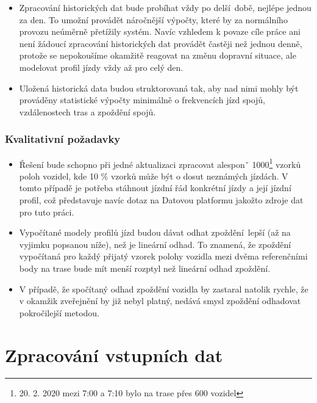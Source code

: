 \begin{itemize}
\item

Zpracování historických dat bude probíhat vždy po delší době, nejlépe jednou za den. To umožní provádět náročnější výpočty, které by za normálního provozu neúměrně přetížily systém. Navíc vzhledem k povaze cíle práce ani není žádoucí zpracování historických dat provádět častěji než jednou denně, protože se nepokoušíme okamžitě reagovat na změnu dopravní situace, ale modelovat profil jízdy vždy až pro celý den.

\item

Uložená historická data budou struktorovaná tak, aby nad nimi mohly být prováděny statistické výpočty minimálně o frekvencích jízd spojů, vzdálenostech tras a zpoždění spojů.
\end{itemize}

\subsubsection{Kvalitativní požadavky}

\begin{itemize}

	\item
	Řešení bude schopno při jedné aktualizaci zpracovat alesponˇ 1000\footnote{20. 2. 2020 mezi 7:00 a 7:10 bylo na trase přes 600 vozidel} vzorků poloh vozidel, kde 10 \% vzorků může být o dosut neznámých jízdách. V tomto případě je potřeba stáhnout jízdní řád konkrétní jízdy a její jízdní profil, což představuje navíc dotaz na Datovou platformu jakožto zdroje dat pro tuto práci.

	\item
	Vypočítané modely profilů jízd budou dávat odhat zpoždění lepší (až na vyjimku popsanou níže), než je lineární odhad. To znamená, že zpoždění vypočítaná pro každý přijatý vzorek polohy vozidla mezi dvěma referenčními body na trase bude mít menší rozptyl než lineární odhad zpoždění.

	\item
	V případě, že spočítaný odhad zpoždění vozidla by zastaral natolik rychle, že v okamžik zveřejnění by již nebyl platný, nedává smysl zpoždění odhadovat pokročilejší metodou.

\end{itemize}


\section{Zpracování vstupních dat} \label{section:zpracovani_vstupnich_dat}

